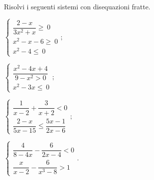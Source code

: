 \begin{esercizio}[\Ast]
\label{ese:20.73}
Risolvi i seguenti sistemi con disequazioni fratte.
\begin{multicols}{2}
\begin{enumeratea}{\longarray
 \item $\left\{\begin{array}{l}
		\dfrac{2-x}{3x^{2}+x}\ge~0\\
		x^{2}-x-6\ge~0\\
		x^{2}-4\le~0
	\end{array}\right.;$
\item $\left\{\begin{array}{l}
        \dfrac{x^{2}-4x+4}{9-x^{2}>0}\\
        x^{2}-3x\le~0
       \end{array}\right.;$
\item $\left\{\begin{array}{l}
	   \dfrac{1}{x-2}+\dfrac{3}{x+2}<0\\
	   \dfrac{2-x}{5x-15}\le\dfrac{5x-1}{2x-6}
	   \end{array}\right.;$
\item $\left\{\begin{array}{l}
	   \dfrac{4}{8-4x}-\dfrac{6}{2x-4}<0\\
	   \dfrac{x}{x-2}-\dfrac{6}{x^{3}-8}>1
	   \end{array}\right..$}
\end{enumeratea}
\end{multicols}
\end{esercizio}

